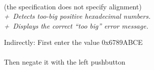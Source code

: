 \begin{enumerate}
{{            \colorbox{LightGreen}{\phantom{xxxxxxxxxxxxxxxx}}
        } \\
        (the specification does not specify alignment) \\
        \textit{+\textonequarter\ Detects too-big positive hexadecimal numbers.} \\
        \textit{+\textonehalf\ Displays the correct ``too big'' error message.}}
        \begin{multicols}{2}
            Indirectly:
            First enter the value 0x6789ABCE \\
                 \\
            Then negate it with the left pushbutton \\

        \columnbreak


\end{multicols}
\end{enumerate}
